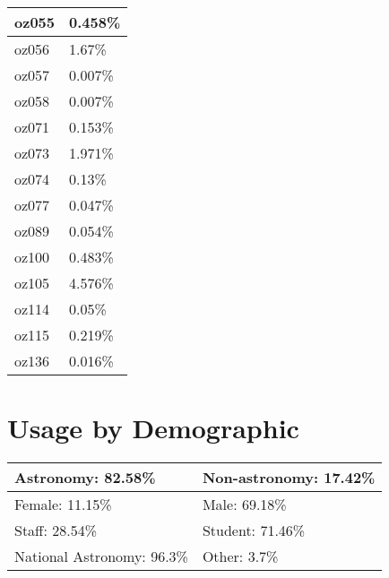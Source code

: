 \documentclass{article}%
\begin{document}
\begin{longtabu}{X[l] X[r]}
\hline%
oz055&0.458\%\\%
\hline%
oz056&1.67\%\\%
\hline%
oz057&0.007\%\\%
\hline%
oz058&0.007\%\\%
\hline%
oz071&0.153\%\\%
\hline%
oz073&1.971\%\\%
\hline%
oz074&0.13\%\\%
\hline%
oz077&0.047\%\\%
\hline%
oz089&0.054\%\\%
\hline%
oz100&0.483\%\\%
\hline%
oz105&4.576\%\\%
\hline%
oz114&0.05\%\\%
\hline%
oz115&0.219\%\\%
\hline%
oz136&0.016\%\\%
\hline%
\end{longtabu}%
\section{Usage by Demographic}%

%
\begin{longtabu}{X[l] X[l]}%
Astronomy:  82.58\%&Non{-}astronomy:  17.42\%\\%
\hline%
Female:  11.15\%&Male:  69.18\%\\%
\hline%
Staff:  28.54\%&Student:  71.46\%\\%
\hline%
National Astronomy:  96.3\%&Other:  3.7\%\\%
\hline%
\end{longtabu}%
\end{document}
